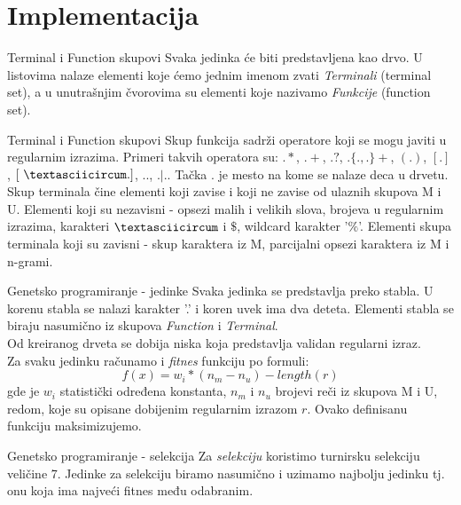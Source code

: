 \section{Implementacija}
    
    \frame{\sectionpage}
    
    \begin{frame}{Terminal i Function skupovi}
        Svaka jedinka će biti predstavljena kao drvo. U listovima
        nalaze elementi koje ćemo jednim imenom zvati \textit{Terminali} (terminal set), a u unutrašnjim čvorovima su elementi koje nazivamo \textit{Funkcije} (function set).
    \end{frame}
    
    \begin{frame}{Terminal i Function skupovi}
        Skup funkcija sadrži operatore koji se mogu javiti u regularnim izrazima. Primeri takvih operatora su: $.*$, $.+$, $.?$, $.\{.,.\}+$, $(.)$, $[.]$, $[\ \textasciicircum .]$, $..$, $.|.$. Tačka . je mesto na kome se nalaze deca u drvetu. \\
        Skup terminala čine elementi koji zavise i koji ne zavise od ulaznih skupova M i U. Elementi
        koji su nezavisni - opsezi malih i velikih slova, brojeva u regularnim izrazima, karakteri $\textasciicircum$ i $\$$, wildcard karakter '$\%$'. Elementi skupa terminala koji su zavisni - skup karaktera iz M,
        parcijalni opsezi karaktera iz M i n-grami.
    \end{frame}
    
    \begin{frame}{Genetsko programiranje - jedinke}
        Svaka jedinka se predstavlja preko stabla. U korenu stabla se nalazi karakter ’.’ i koren uvek ima dva deteta. Elementi stabla se biraju nasumično iz  skupova \textit{Function} i \textit{Terminal}. \\
        Od kreiranog drveta se dobija niska koja predstavlja validan regularni izraz. \\
        Za svaku jedinku računamo i \textit{fitnes} funkciju po formuli:
        $$f(x) = w_i * (n_m - n_u) - length(r)$$
        gde je $w_i$ statistički određena konstanta, $n_m$ i $n_u$ brojevi reči iz skupova M i U, redom, koje su opisane dobijenim regularnim izrazom $r$. Ovako definisanu funkciju maksimizujemo.
    \end{frame}
    
    \begin{frame}{Genetsko programiranje - selekcija}
        Za \textit{selekciju} koristimo turnirsku selekciju veličine 7. Jedinke za selekciju biramo nasumično i uzimamo najbolju jedinku tj. onu koja ima najveći fitnes među odabranim.
    \end{frame}
    
